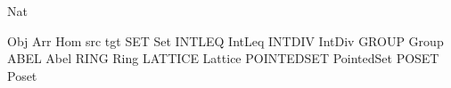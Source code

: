 \def\type#1{{\namedtype{#1}}}
\DefType Nat
\def\oftype{\mathrel{:}}
\let\is=\oftype
\def\namedrule#1{{\scshape #1}}
\def\rulelabel#1{{\smaller\scshape #1}}

\def\cat#1{{\mathsfmbf {#1}}}
\def\one{{\mathit 1}}
\def\oneof#1{{\one_{#1}}}
\DefOpP Obj
\DefOpP Arr
\DefOp Hom
\DefOp src
\DefOp tgt
\DefCAT SET         Set
\DefCAT INTLEQ      IntLeq
\DefCAT INTDIV      IntDiv
\DefCAT GROUP       Group
\DefCAT ABEL        Abel
\DefCAT RING        Ring
\DefCAT LATTICE     Lattice
\DefCAT POINTEDSET  PointedSet
\DefCAT POSET       Poset

\let\bottom=\bot
\def\smallcovby{\mathrel{-\mkern-8mu\Yleft}}
\def\covby{\mathrel{-\mkern-9mu<}}
\def\wellbelow{\mathrel{\ll}}
\let\wbelow=\wellbelow
\def\incomparable{\doublemidrel}
\def\altincomparable{\mathrel{\rangle\mkern-5mu\langle}}
\let\incomp=\incomparable
\def\embto{\mathrel{\hookrightarrow}}
\def\embijto{\hookrightarrow\mathrel{\mkern-15mu}\rightarrow}
\def\dmnd{\mathbin{\diamond}}
\def\join{\mathbin{\vee}}
\def\meet{\mathbin{\wedge}}
\def\Join{\bigvee}
\def\Meet{\bigwedge}
\def\downsets#1{\cal O(#1)}
\let\downs=\downsets
\def\down{\mathord{\downarrow}}
\def\up{\mathord{\uparrow}}
\def\dualposet#1{{#1}^\partial}
\let\dual=\dualposet
\def\ubs#1{{#1}^{\mathrmtiny{U}}}
\def\lbs#1{{#1}^{\mathrmtiny{L}}}
\def\lub{\namedop{lub}}
\def\glb{\namedop{glb}}
\def\fixpoints{\namedop{Fix}}
\def\lfp{\namedop{lfp}}
\def\gfp{\namedop{gfp}}
\def\lift#1{#1_{\bot}}
\def\posetplus{\oplus}
\def\posetunion{\uplus}
\def\ordplus{\oplus}
\def\ordinal#1{\mathbf{#1}}
\let\ordnum=\ordinal
\def\flatnum#1{\overline{\mathbf{#1}}}

